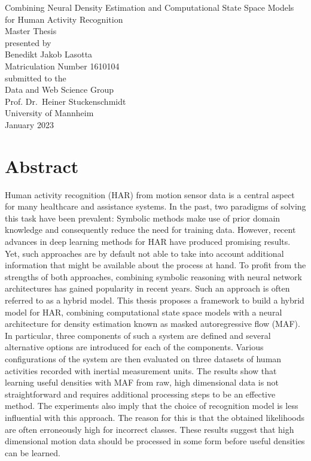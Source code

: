 \documentclass[11pt,titlepage,oneside,openany]{book}
\begin{document}
\begin{titlepage}
	\vspace*{2cm}
  \begin{center}
   {\Large Combining Neural Density Estimation and Computational State Space Models for Human Activity Recognition\\}
   \vspace{2cm} 
   {Master Thesis\\}
   \vspace{2cm}
   {presented by\\
    Benedikt Jakob Lasotta \\
    Matriculation Number 1610104\\
   }
   \vspace{1cm} 
   {submitted to the\\
    Data and Web Science Group\\
    Prof. Dr.\ Heiner Stuckenschmidt\\
    University of Mannheim\\} \vspace{2cm}
   {January 2023}
  \end{center}
\end{titlepage}

\chapter*{Abstract}
Human activity recognition (HAR) from motion sensor data is a central aspect for many healthcare and assistance systems. In the past, two paradigms of solving this task have been prevalent: Symbolic methods make use of prior domain knowledge and consequently reduce the need for training data. However, recent advances in deep learning methods for HAR have produced promising results. Yet, such approaches are by default not able to take into account additional information that might be available about the process at hand. To profit from the strengths of both approaches, combining symbolic reasoning with neural network architectures has gained popularity in recent years. Such an approach is often referred to as a hybrid model. This thesis proposes a framework to build a hybrid model for HAR, combining computational state space models with a neural architecture for density estimation known as masked autoregressive flow (MAF). In particular, three components of such a system are defined and several alternative options are introduced for each of the components. Various configurations of the system are then evaluated on three datasets of human activities recorded with inertial measurement units. The results show that learning useful densities with MAF from raw, high dimensional data is not straightforward and requires additional processing steps to be an effective method. The experiments also imply that the choice of recognition model is less influential with this approach. The reason for this is that the obtained likelihoods are often erroneously high for incorrect classes. These results suggest that high dimensional motion data should be processed in some form before useful densities can be learned.
\end{document}
